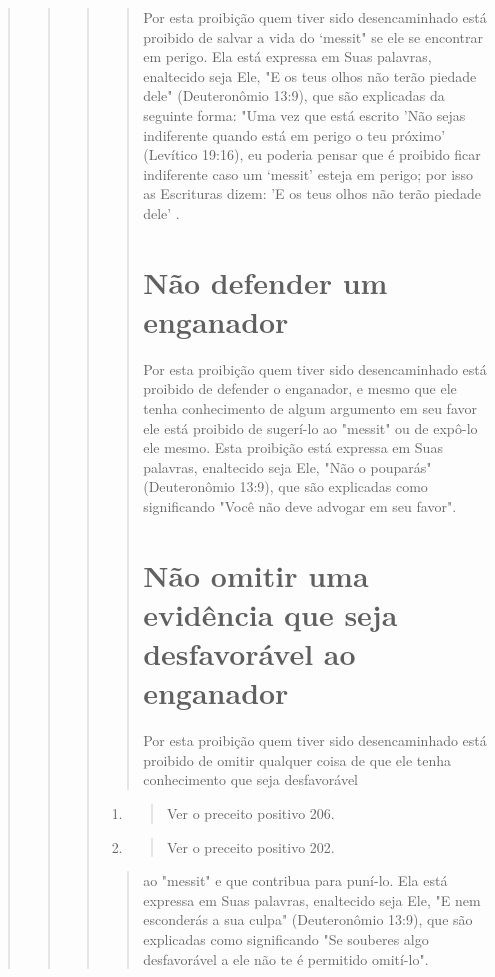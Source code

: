 \begin{quote}
\begin{quote}
\begin{quote}
\begin{quote}
Por esta proibição quem tiver sido desencaminhado está proibido de
salvar a vida do `messit" se ele se encontrar em perigo. Ela está
expressa em Suas palavras, enaltecido seja Ele, "E os teus olhos não
terão piedade dele" (Deuteronômio 13:9), que são explicadas da seguinte
forma: "Uma vez que es­tá escrito 'Não sejas indiferente quando está em
perigo o teu próximo' (Levíti­co 19:16), eu poderia pensar que é
proibido ficar indiferente caso um `messit' esteja em perigo; por isso
as Escrituras dizem: 'E os teus olhos não terão pieda­de dele' .

\section{Não defender um enganador}

Por esta proibição quem tiver sido desencaminhado está proibido de
defender o enganador, e mesmo que ele tenha conhecimento de algum
ar­gumento em seu favor ele está proibido de sugerí-lo ao "messit" ou de
expô-lo ele mesmo. Esta proibição está expressa em Suas palavras,
enaltecido seja Ele, "Não o pouparás" (Deuteronômio 13:9), que são
explicadas como significan­do "Você não deve advogar em seu favor".

\section{Não omitir uma evidência que seja desfavorável ao enganador}

Por esta proibição quem tiver sido desencaminhado está proibido de
omitir qualquer coisa de que ele tenha conhecimento que seja
desfavorável
\end{quote}

\begin{enumerate}
\def\labelenumi{\arabic{enumi}.}
\setcounter{enumi}{241}
\item
 \begin{quote}
 Ver o preceito positivo 206.
 \end{quote}
\item
 \begin{quote}
 Ver o preceito positivo 202.
 \end{quote}
\end{enumerate}

\begin{quote}ao "messit" e que contribua para puní-lo. Ela está expressa em Suas
palavras, enaltecido seja Ele, "E nem esconderás a sua culpa"
(Deuteronômio 13:9), que são explicadas como significando "Se souberes
algo desfavorável a ele não te é permitido omití-lo".


\end{quote}
\end{quote}
\end{quote}
\end{quote}
